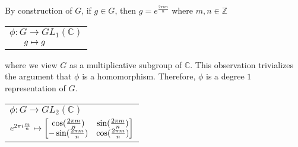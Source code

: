 	

\begin{example}\end{example} 
By construction of $G$, if $g\in G$, then $g = e^{\frac{2\pi im }{n}}$ where $m,n\in \mathbb{Z}$	
	\renewcommand{\arraystretch}{0.7}
		\begin{center}	
		 \begin{tabular}{l}$\phi:G\rightarrow GL_1(\mathbb{C})$\\
		$\hspace{6mm}g\mapsto g$
		\end{tabular}
		\end{center}

\noindent where we view $G$ as a multiplicative subgroup of $\mathbb{C}$. This observation trivializes the argument that $\phi$ is a homomorphism. Therefore, $\phi$ is a degree $1$ representation of $G$.		


\begin{example}\end{example}
	\renewcommand{\arraystretch}{1}\begin{center}
		\begin{tabular}{l}$\phi:G\rightarrow GL_2(\mathbb{C})$\\
		$\hspace{0mm}e^{2\pi i\frac{m}{n}}\mapsto \begin{bmatrix}
							\cos(\frac{2\pi m}{n}) & \sin(\frac{2\pi m}{n}) \\
							-\sin(\frac{2\pi m}{n}) & \cos(\frac{2\pi m}{n})
						      \end{bmatrix}$
		\end{tabular}
\end{center}

